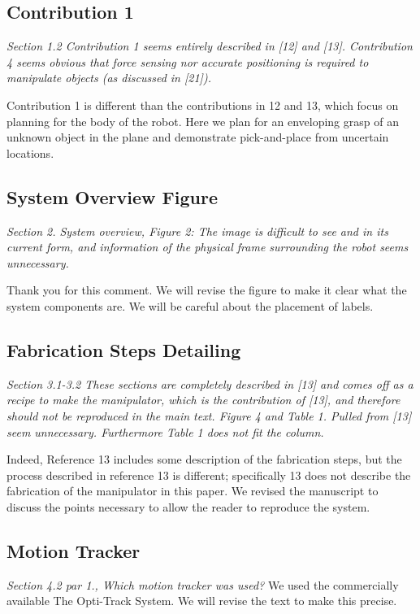\documentclass[letterpaper, 10 pt, twocolumn, conference]{article}
\begin{document}
\subsection{Contribution 1}
\textit{Section 1.2 Contribution 1 seems entirely described in [12] and [13]. Contribution 4 seems obvious that force sensing nor accurate positioning is required to manipulate objects (as discussed in [21]).}

Contribution 1 is different than the contributions in 12 and 13, which focus on planning for the body of the robot. Here we plan for an enveloping grasp of an unknown object in the plane and demonstrate pick-and-place from uncertain locations. 

\subsection{System Overview Figure}
\textit{Section 2. System overview, Figure 2: The image is difficult to see and in its current form, and information of the physical frame surrounding the robot seems unnecessary.}

Thank you for this comment. We will revise the figure to make it clear what the system components are. We will be careful about the placement of labels. 

\subsection{Fabrication Steps Detailing}
\textit{Section 3.1-3.2 These sections are completely described in [13] and comes off as a recipe to make the manipulator, which is the contribution of [13], and therefore should not be reproduced in the main text. Figure 4 and Table 1. Pulled from [13] seem unnecessary. Furthermore Table 1 does not fit the column.}

Indeed, Reference 13 includes some description of the fabrication steps, but the process described in reference 13 is different; specifically 13 does not describe the fabrication of the manipulator in this paper. We revised the manuscript to discuss the points necessary to allow the reader to reproduce the system.

\subsection{Motion Tracker}
\textit{Section 4.2 par 1., Which motion tracker was used?}
We used the commercially available The Opti-Track System. We will revise the text to make this precise.
\end{document}
